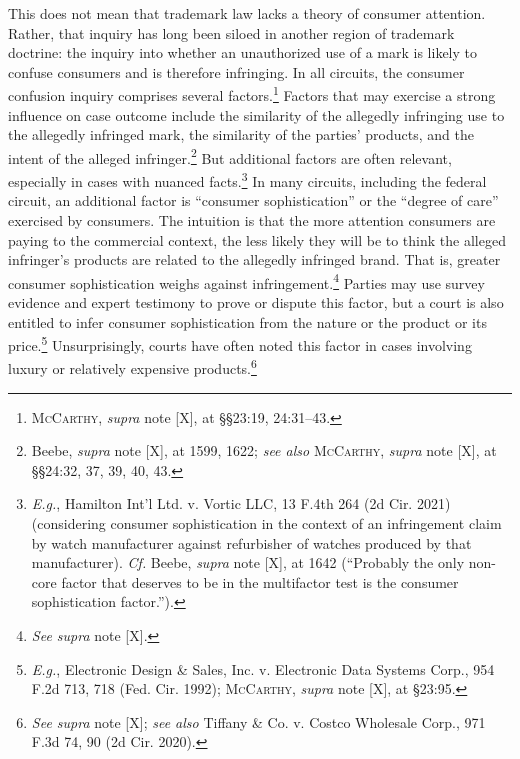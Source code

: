 \documentclass[letterpaper, 11pt, oneside]{article}
\begin{document}
This does not mean that trademark law lacks a theory of consumer attention. Rather, that inquiry has long been siloed in another region of trademark doctrine: the inquiry into whether an unauthorized use of a mark is likely to confuse consumers and is therefore infringing. In all circuits, the consumer confusion inquiry comprises several factors.\footnote{\textsc{McCarthy}, \textit{supra} note [X], at \S\S 23:19, 24:31–43.} Factors that may exercise a strong influence on case outcome include the similarity of the allegedly infringing use to the allegedly infringed mark, the similarity of the parties' products, and the intent of the alleged infringer.\footnote{Beebe, \textit{supra} note [X], at 1599, 1622; \textit{see also} \textsc{McCarthy}, \textit{supra} note [X], at \S\S 24:32, 37, 39, 40, 43.} But additional factors are often relevant, especially in cases with nuanced facts.\footnote{\textit{E.g.}, Hamilton Int'l Ltd. v. Vortic LLC, 13 F.4th 264 (2d Cir. 2021) (considering consumer sophistication in the context of an infringement claim by watch manufacturer against refurbisher of watches produced by that manufacturer). \textit{Cf.} Beebe, \textit{supra} note [X], at 1642 (``Probably the only non-core factor that deserves to be in the multifactor test is the consumer sophistication factor.'').} In many circuits, including the federal circuit, an additional factor is ``consumer sophistication'' or the ``degree of care'' exercised by consumers. The intuition is that the more attention consumers are paying to the commercial context, the less likely they will be to think the alleged infringer's products are related to the allegedly infringed brand. That is, greater consumer sophistication weighs against infringement.\footnote{\textit{See supra} note [X].} Parties may use survey evidence and expert testimony to prove or dispute this factor, but a court is also entitled to infer consumer sophistication from the nature or the product or its price.\footnote{\textit{E.g.}, Electronic Design \& Sales, Inc. v. Electronic Data Systems Corp., 954 F.2d 713, 718 (Fed. Cir. 1992); \textsc{McCarthy}, \textit{supra} note [X], at \S 23:95.} Unsurprisingly, courts have often noted this factor in cases involving luxury or relatively expensive products.\footnote{\textit{See supra} note [X]; \textit{see also} Tiffany \& Co. v. Costco Wholesale Corp., 971 F.3d 74, 90 (2d Cir. 2020).}
\end{document}
